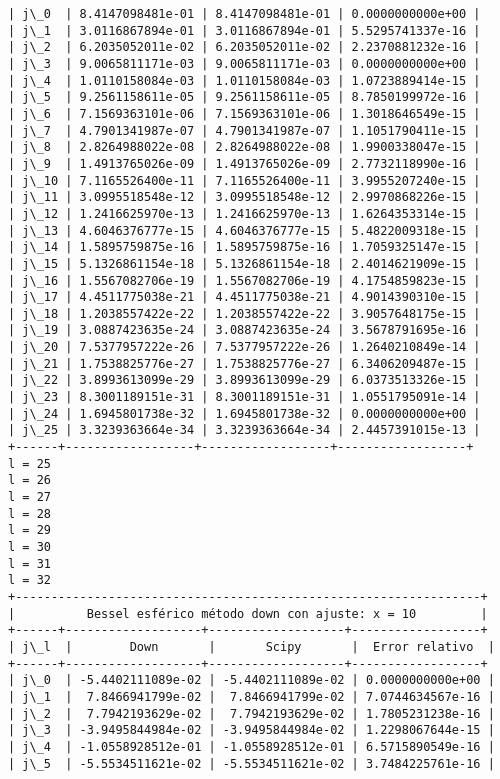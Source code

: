 \documentclass[9pt]{article}
\begin{document}
\begin{Verbatim}[commandchars=\\\{\}]
| j\_0  | 8.4147098481e-01 | 8.4147098481e-01 | 0.0000000000e+00 |
| j\_1  | 3.0116867894e-01 | 3.0116867894e-01 | 5.5295741337e-16 |
| j\_2  | 6.2035052011e-02 | 6.2035052011e-02 | 2.2370881232e-16 |
| j\_3  | 9.0065811171e-03 | 9.0065811171e-03 | 0.0000000000e+00 |
| j\_4  | 1.0110158084e-03 | 1.0110158084e-03 | 1.0723889414e-15 |
| j\_5  | 9.2561158611e-05 | 9.2561158611e-05 | 8.7850199972e-16 |
| j\_6  | 7.1569363101e-06 | 7.1569363101e-06 | 1.3018646549e-15 |
| j\_7  | 4.7901341987e-07 | 4.7901341987e-07 | 1.1051790411e-15 |
| j\_8  | 2.8264988022e-08 | 2.8264988022e-08 | 1.9900338047e-15 |
| j\_9  | 1.4913765026e-09 | 1.4913765026e-09 | 2.7732118990e-16 |
| j\_10 | 7.1165526400e-11 | 7.1165526400e-11 | 3.9955207240e-15 |
| j\_11 | 3.0995518548e-12 | 3.0995518548e-12 | 2.9970868226e-15 |
| j\_12 | 1.2416625970e-13 | 1.2416625970e-13 | 1.6264353314e-15 |
| j\_13 | 4.6046376777e-15 | 4.6046376777e-15 | 5.4822009318e-15 |
| j\_14 | 1.5895759875e-16 | 1.5895759875e-16 | 1.7059325147e-15 |
| j\_15 | 5.1326861154e-18 | 5.1326861154e-18 | 2.4014621909e-15 |
| j\_16 | 1.5567082706e-19 | 1.5567082706e-19 | 4.1754859823e-15 |
| j\_17 | 4.4511775038e-21 | 4.4511775038e-21 | 4.9014390310e-15 |
| j\_18 | 1.2038557422e-22 | 1.2038557422e-22 | 3.9057648175e-15 |
| j\_19 | 3.0887423635e-24 | 3.0887423635e-24 | 3.5678791695e-16 |
| j\_20 | 7.5377957222e-26 | 7.5377957222e-26 | 1.2640210849e-14 |
| j\_21 | 1.7538825776e-27 | 1.7538825776e-27 | 6.3406209487e-15 |
| j\_22 | 3.8993613099e-29 | 3.8993613099e-29 | 6.0373513326e-15 |
| j\_23 | 8.3001189151e-31 | 8.3001189151e-31 | 1.0551795091e-14 |
| j\_24 | 1.6945801738e-32 | 1.6945801738e-32 | 0.0000000000e+00 |
| j\_25 | 3.3239363664e-34 | 3.3239363664e-34 | 2.4457391015e-13 |
+------+------------------+------------------+------------------+
l = 25
l = 26
l = 27
l = 28
l = 29
l = 30
l = 31
l = 32
+-----------------------------------------------------------------+
|          Bessel esférico método down con ajuste: x = 10         |
+------+-------------------+-------------------+------------------+
| j\_l  |        Down       |       Scipy       |  Error relativo  |
+------+-------------------+-------------------+------------------+
| j\_0  | -5.4402111089e-02 | -5.4402111089e-02 | 0.0000000000e+00 |
| j\_1  |  7.8466941799e-02 |  7.8466941799e-02 | 7.0744634567e-16 |
| j\_2  |  7.7942193629e-02 |  7.7942193629e-02 | 1.7805231238e-16 |
| j\_3  | -3.9495844984e-02 | -3.9495844984e-02 | 1.2298067644e-15 |
| j\_4  | -1.0558928512e-01 | -1.0558928512e-01 | 6.5715890549e-16 |
| j\_5  | -5.5534511621e-02 | -5.5534511621e-02 | 3.7484225761e-16 |

\end{Verbatim}
\end{document}
